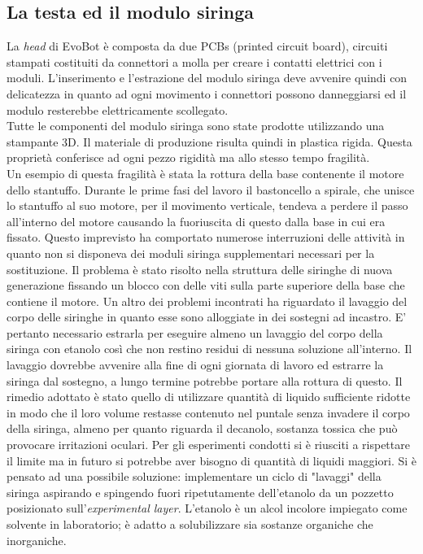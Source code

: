 \subsection{La testa ed il modulo siringa}
La \emph{head} di EvoBot è composta da due PCBs (printed circuit board), circuiti stampati costituiti da connettori a molla per creare i contatti elettrici con i moduli. L'inserimento e l'estrazione del modulo siringa deve avvenire quindi con delicatezza in quanto ad ogni movimento i connettori possono danneggiarsi ed il modulo resterebbe elettricamente scollegato.
\\Tutte le componenti del modulo siringa sono state prodotte utilizzando una stampante 3D. Il materiale di produzione risulta quindi in plastica rigida. Questa proprietà conferisce ad ogni pezzo rigidità ma allo stesso tempo fragilità.
\\Un esempio di questa fragilità è stata la rottura della base contenente il motore dello stantuffo. Durante le prime fasi del lavoro il bastoncello a spirale, che unisce lo stantuffo al suo motore, per il movimento verticale, tendeva a perdere il passo all'interno del motore causando la fuoriuscita di questo dalla base in cui era fissato. 
Questo imprevisto ha comportato numerose interruzioni delle attività in quanto non si disponeva dei moduli siringa supplementari necessari per la sostituzione. Il problema è stato risolto nella struttura delle siringhe di nuova generazione fissando un blocco con delle viti sulla parte superiore della base che contiene il motore. 
Un altro dei problemi incontrati ha riguardato il lavaggio del corpo delle siringhe in quanto esse sono alloggiate in dei sostegni ad incastro. E’ pertanto necessario estrarla per eseguire almeno un lavaggio del corpo della siringa con etanolo così che non restino residui di nessuna soluzione all'interno. Il lavaggio dovrebbe avvenire alla fine di ogni giornata di lavoro ed estrarre la siringa dal sostegno, a lungo termine potrebbe portare alla rottura di questo. Il rimedio adottato è stato quello di utilizzare quantità di liquido sufficiente ridotte in modo che il loro volume restasse contenuto nel puntale senza invadere il corpo della siringa, almeno per quanto riguarda il decanolo, sostanza tossica che può provocare irritazioni oculari. Per gli esperimenti condotti si è riusciti a rispettare il limite ma in futuro si potrebbe aver bisogno di quantità di liquidi maggiori. Si è pensato ad una possibile soluzione: implementare un ciclo di "lavaggi" della siringa aspirando e spingendo fuori ripetutamente dell'etanolo da un pozzetto posizionato sull'\emph{experimental layer}. L'etanolo è un alcol incolore impiegato come solvente in laboratorio; è adatto a solubilizzare sia sostanze organiche che inorganiche. 
